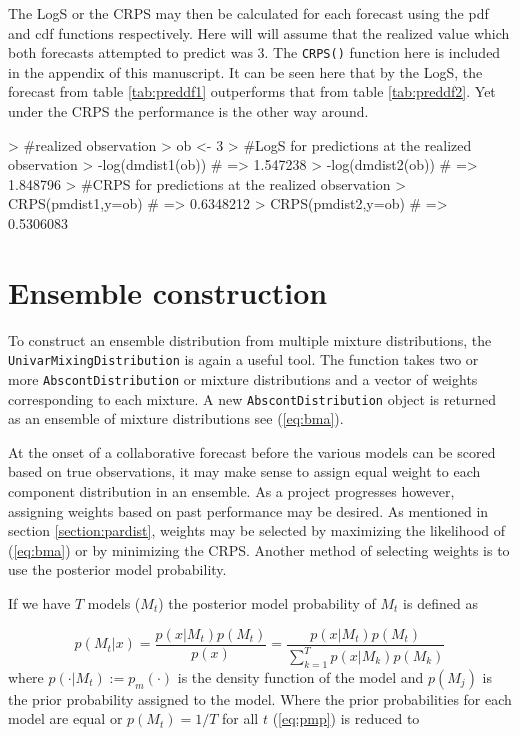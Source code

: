 \documentclass[11pt,notitlepage]{isuthesis}
\begin{document}
The LogS or the CRPS may then be calculated for each forecast using the pdf
and cdf functions respectively. Here will will assume that the realized value
which both forecasts attempted to predict was 3. The \texttt{CRPS()} function 
here is 
included in the appendix of this manuscript. It can be seen here that by the 
LogS, the forecast from table \ref{tab:preddf1} outperforms that from table
\ref{tab:preddf2}. Yet under the CRPS the performance is the other way around.

\begin{Schunk}
\begin{Sinput}
> #realized observation
> ob <- 3
> #LogS for predictions at the realized observation
> -log(dmdist1(ob)) # => 1.547238
> -log(dmdist2(ob)) # => 1.848796
> #CRPS for predictions at the realized observation
> CRPS(pmdist1,y=ob) # => 0.6348212
> CRPS(pmdist2,y=ob) # => 0.5306083
\end{Sinput}
\end{Schunk}

\section{Ensemble construction}


To construct an ensemble distribution from multiple mixture distributions, the 
\texttt{UnivarMixingDistribution} is again a useful tool. The function takes 
two or more
\texttt{AbscontDistribution} or mixture distributions and a vector of weights 
corresponding to each mixture. A new \texttt{AbscontDistribution} object is 
returned as an ensemble of mixture distributions see (\ref{eq:bma}). 

At the onset of a collaborative forecast before the various models can be scored
based on true observations, it may make sense to assign equal weight to each 
component distribution in an ensemble. As a project progresses however, 
assigning weights based on past performance may be desired. As mentioned in 
section \ref{section:pardist}, weights may be selected by maximizing the
likelihood of (\ref{eq:bma}) or by minimizing the CRPS. Another method of 
selecting weights is to use the posterior model probability. 

If we have $T$ models ($M_t$) the posterior model probability of $M_t$ is 
defined as 

\begin{equation}
\label{eq:pmp}
p(M_t|x) = \frac{p(x|M_t)p(M_t)}{p(x)}
         = \frac{p(x|M_t)p(M_t)}{\sum_{k=1}^T p(x|M_k)p(M_k)}
\end{equation}
where $p(\cdot |M_t) := p_m(\cdot)$ is the density function of the model and 
$p(M_j)$ is the prior probability assigned to the model. Where the prior
probabilities for each model are equal or $p(M_t) = 1/T$ for all $t$ 
(\ref{eq:pmp}) is reduced to 
\end{document}

